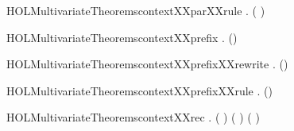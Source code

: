 \newcommand{\HOLMultivariateTheoremscontextXXparXXrewrite}{\UseVerbatim{HOLMultivariateTheoremscontextXXparXXrewrite}}
\begin{SaveVerbatim}{HOLMultivariateTheoremscontextXXparXXrule}
\HOLTokenTurnstile{} \HOLSymConst{\HOLTokenForall{}}  .
          \HOLSymConst{\HOLTokenConj{}}    \HOLSymConst{\HOLTokenImp{}}   ( \HOLSymConst{\ensuremath{\parallel}} )
\end{SaveVerbatim}
\newcommand{\HOLMultivariateTheoremscontextXXparXXrule}{\UseVerbatim{HOLMultivariateTheoremscontextXXparXXrule}}
\begin{SaveVerbatim}{HOLMultivariateTheoremscontextXXprefix}
\HOLTokenTurnstile{} \HOLSymConst{\HOLTokenForall{}}  .   () \HOLSymConst{\HOLTokenImp{}}   
\end{SaveVerbatim}
\newcommand{\HOLMultivariateTheoremscontextXXprefix}{\UseVerbatim{HOLMultivariateTheoremscontextXXprefix}}
\begin{SaveVerbatim}{HOLMultivariateTheoremscontextXXprefixXXrewrite}
\HOLTokenTurnstile{} \HOLSymConst{\HOLTokenForall{}}  .   () \HOLSymConst{\HOLTokenEquiv{}}   
\end{SaveVerbatim}
\newcommand{\HOLMultivariateTheoremscontextXXprefixXXrewrite}{\UseVerbatim{HOLMultivariateTheoremscontextXXprefixXXrewrite}}
\begin{SaveVerbatim}{HOLMultivariateTheoremscontextXXprefixXXrule}
\HOLTokenTurnstile{} \HOLSymConst{\HOLTokenForall{}}  .    \HOLSymConst{\HOLTokenImp{}}   ()
\end{SaveVerbatim}
\newcommand{\HOLMultivariateTheoremscontextXXprefixXXrule}{\UseVerbatim{HOLMultivariateTheoremscontextXXprefixXXrule}}
\begin{SaveVerbatim}{HOLMultivariateTheoremscontextXXrec}
\HOLTokenTurnstile{} \HOLSymConst{\HOLTokenForall{}}  .
         (  ) \HOLSymConst{\HOLTokenImp{}}
          \HOLSymConst{\HOLTokenConj{}}  ( ) ( )
\end{SaveVerbatim}

